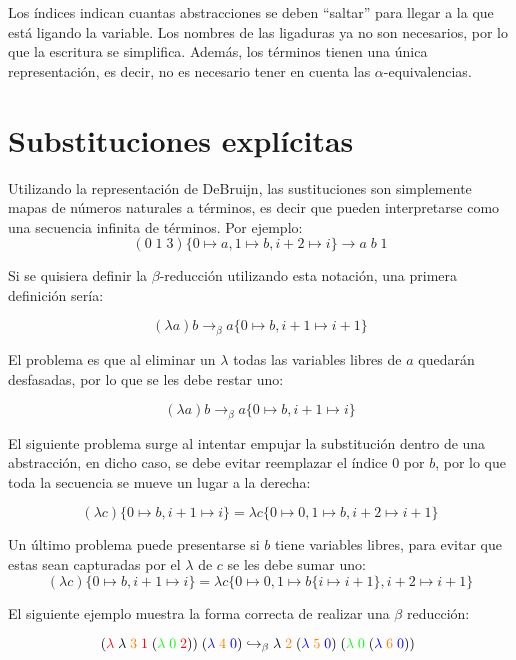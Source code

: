Los índices indican cuantas abstracciones se deben ``saltar'' para llegar a la que está ligando la variable.
Los nombres de las ligaduras ya no son necesarios, por lo que la escritura se simplifica.
Además, los términos tienen una única representación, es decir, no es necesario tener en cuenta las $\alpha$-equivalencias.


\section{Substituciones explícitas}
Utilizando la representación de DeBruijn, las sustituciones son simplemente mapas de números naturales a términos, es decir que pueden interpretarse como una secuencia infinita de términos.
Por ejemplo:
\[ (0\; 1\; 3)\{0\mapsto a, 1\mapsto b, i+2\mapsto i\} \rightarrow a\; b\; 1 \]

Si se quisiera definir la $\beta$-reducción utilizando esta notación, una primera definición sería:

\[ (\lambda a)b \rightarrow_{\beta} a \{ 0 \mapsto b, i+1\mapsto i+1 \} \]

El problema es que al eliminar un $\lambda$ todas las variables libres de $a$ quedarán desfasadas, por lo que se les debe restar uno:

\[ (\lambda a)b \rightarrow_{\beta} a \{ 0 \mapsto b, i+1\mapsto i \} \]

El siguiente problema surge al intentar empujar la substitución dentro de una abstracción, en dicho caso, se debe evitar reemplazar el índice 0 por $b$, por lo que toda la secuencia se mueve un lugar a la derecha:

\[ (\lambda c)\{ 0 \mapsto b, i+1\mapsto i \} = \lambda c \{ 0 \mapsto 0, 1 \mapsto b, i+2\mapsto i+1 \} \]

Un último problema puede presentarse si $b$ tiene variables libres, para evitar que estas sean capturadas por el $\lambda$ de $c$ se les debe sumar uno:
\[ (\lambda c)\{ 0 \mapsto b, i+1\mapsto i \} = \lambda c \{ 0 \mapsto 0, 1 \mapsto b \{ i \mapsto i+1 \}, i+2\mapsto i+1 \} \]

El siguiente ejemplo muestra la forma correcta de realizar una $\beta$ reducción:

\[
(\textcolor{red}{\lambda}\; \lambda\; \textcolor{orange}{3}\; \textcolor{red}{1}\; (\textcolor{green}{\lambda\; 0}\; \textcolor{red}{2}))\; (\textcolor{blue}{\lambda}\; \textcolor{orange}{4}\; \textcolor{blue}{0})
\hookrightarrow_\beta
\lambda \; \textcolor{orange}{2} \; (\textcolor{blue}{\lambda}\; \textcolor{orange}{5}\; \textcolor{blue}{0})\; (\textcolor{green}{\lambda\; 0}\; (\textcolor{blue}{\lambda}\; \textcolor{orange}{6}\; \textcolor{blue}{0}))\;
\]

